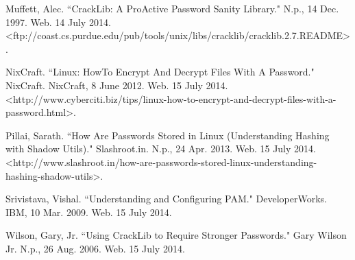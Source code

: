 \documentclass[11pt,a4paper]{article}
\begin{document}
Muffett, Alec. ``CrackLib: A ProActive Password Sanity Library." N.p., 14 Dec. 1997. Web. 14 July 2014. <ftp://coast.cs.purdue.edu/pub/tools/unix/libs/cracklib/cracklib.2.7.README>.

NixCraft. ``Linux: HowTo Encrypt And Decrypt Files With A Password." NixCraft. NixCraft, 8 June 2012. Web. 15 July 2014. <http://www.cyberciti.biz/tips/linux-how-to-encrypt-and-decrypt-files-with-a-password.html>.

Pillai, Sarath. ``How Are Passwords Stored in Linux (Understanding Hashing with Shadow Utils)." Slashroot.in. N.p., 24 Apr. 2013. Web. 15 July 2014. <http://www.slashroot.in/how-are-passwords-stored-linux-understanding-hashing-shadow-utils>.

Srivistava, Vishal. ``Understanding and Configuring PAM." DeveloperWorks. IBM, 10 Mar. 2009. Web. 15 July 2014.

Wilson, Gary, Jr. ``Using CrackLib to Require Stronger Passwords." Gary Wilson Jr. N.p., 26 Aug. 2006. Web. 15 July 2014.
\end{document}
